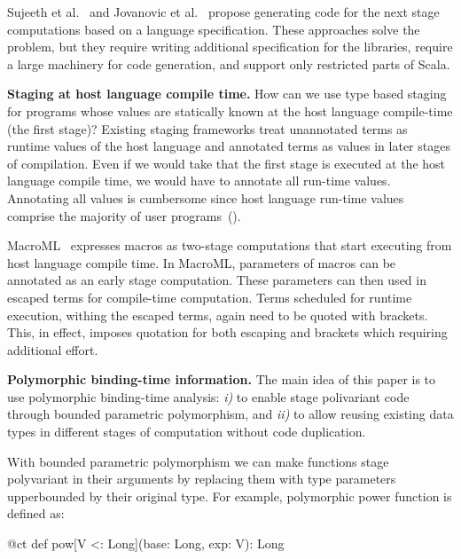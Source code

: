 Sujeeth et al.~\cite{forge} and Jovanovic et al.~\cite{yin-yang}
 propose generating code for the next stage computations based on
 a language specification. These approaches solve the problem,
 but they require writing additional specification for the libraries,
 require a large machinery for code generation,
 and support only restricted parts of Scala.

{\bf Staging at host language compile time.} How can we use type based staging for programs whose values are statically
 known at the host language compile-time (the first stage)? Existing staging frameworks
 treat unannotated terms as runtime values of the host language and annotated terms as
 values in later stages of compilation. Even if we would take that the first stage is executed
 at the host language compile time, we would have to annotate all run-time values.
 Annotating all values is cumbersome since host language run-time values comprise
 the majority of user programs~().


MacroML~\cite{ganz2001macros} expresses macros as two-stage computations that start executing from host language compile time.
 In MacroML, parameters of macros can be annotated as an early stage computation. These parameters
 can then used in escaped terms for compile-time computation. Terms scheduled for runtime execution,
 withing the escaped terms, again need to be quoted with brackets. This,
 in effect, imposes quotation for both escaping and brackets which requiring additional effort.


{\bf Polymorphic binding-time information.} The main idea of this paper is to use polymorphic binding-time analysis:
 \emph{i)} to enable stage polivariant code through bounded parametric polymorphism, and \emph{ii)} to allow reusing existing
 data types in different stages of computation without code duplication.

With bounded parametric polymorphism we can make functions stage polyvariant in their arguments by replacing them with
type parameters upperbounded by their original type. For example, polymorphic power function is defined as:\begin{lstparagraph}
@ct def pow[V <: Long](base: Long, exp: V): Long
\end{lstparagraph}

